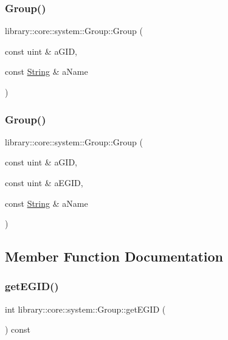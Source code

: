 \subsubsection{\texorpdfstring{Group()}{Group()}\hspace{0.1cm}{\footnotesize\ttfamily [1/2]}}
{\footnotesize\ttfamily library\+::core\+::system\+::\+Group\+::\+Group (\begin{DoxyParamCaption}\item[{const uint \&}]{a\+G\+ID,  }\item[{const \hyperlink{classlibrary_1_1core_1_1types_1_1String}{String} \&}]{a\+Name }\end{DoxyParamCaption})}

\mbox{\label{classlibrary_1_1core_1_1system_1_1Group_aa6a21b13948d6be0e344503b9e31f3ef}} 
\subsubsection{\texorpdfstring{Group()}{Group()}\hspace{0.1cm}{\footnotesize\ttfamily [2/2]}}
{\footnotesize\ttfamily library\+::core\+::system\+::\+Group\+::\+Group (\begin{DoxyParamCaption}\item[{const uint \&}]{a\+G\+ID,  }\item[{const uint \&}]{a\+E\+G\+ID,  }\item[{const \hyperlink{classlibrary_1_1core_1_1types_1_1String}{String} \&}]{a\+Name }\end{DoxyParamCaption})}



\subsection{Member Function Documentation}
\mbox{\label{classlibrary_1_1core_1_1system_1_1Group_ab9677f28eb1f6653ad9c5776d1f00c3f}} 
\subsubsection{\texorpdfstring{get\+E\+G\+I\+D()}{getEGID()}}
{\footnotesize\ttfamily int library\+::core\+::system\+::\+Group\+::get\+E\+G\+ID (\begin{DoxyParamCaption}{ }\end{DoxyParamCaption}) const}

